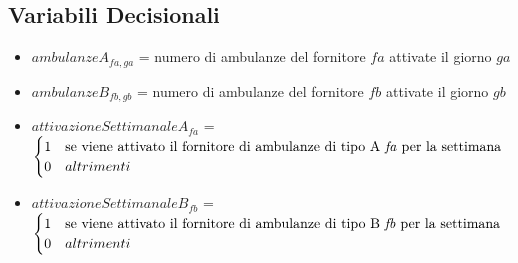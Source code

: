 \subsection{Variabili Decisionali}
\begin{itemize}
    \item $ambulanzeA_{fa, ga}$ = numero di ambulanze del fornitore $fa$ attivate il giorno $ga$
    \item $ambulanzeB_{fb, gb}$ =  numero di ambulanze del fornitore $fb$ attivate il giorno $gb$
    \item $attivazioneSettimanaleA_{fa}$ = 
    \(
    \begin{cases}
        1 & \text{se viene attivato il fornitore di ambulanze di tipo A \textit{fa} per la settimana} \\
        0 & altrimenti
    \end{cases}\)
    \item $attivazioneSettimanaleB_{fb}$ = 
    \(
    \begin{cases}
        1 & \text{se viene attivato il fornitore di ambulanze di tipo B \textit{fb} per la settimana} \\
        0 & altrimenti
    \end{cases}\)
\end{itemize}
